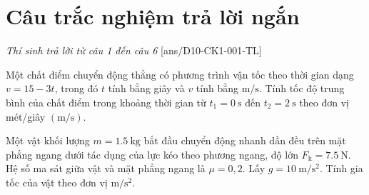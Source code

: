 \section{Câu trắc nghiệm trả lời ngắn} \textit{Thí sinh trả lời từ câu 1 đến câu 6}
\setcounter{ex}{0}
[ans/D10-CK1-001-TL]
\begin{ex}
	Một chất điểm chuyển động thẳng có phương trình vận tốc theo thời gian dạng $v=15-3t$, trong đó $t$ tính bằng giây và $v$ tính bằng $\si{\meter/\second}$. Tính tốc độ trung bình của chất điểm trong khoảng thời gian từ $t_1=\SI{0}{\second}$ đến $t_2=\SI{2}{\second}$ theo đơn vị mét/giây $\left(\si{\meter/\second}\right)$.
	\loigiai{
		
	}
\end{ex}
\begin{ex}
	Một vật khối lượng $m=\SI{1.5}{\kilogram}$ bắt đầu chuyển động nhanh dần đều trên mặt phẳng ngang dưới tác dụng của lực kéo theo phương ngang, độ lớn $F_{\mathrm{k}}=\SI{7.5}{\newton}$. Hệ số ma sát giữa vật và mặt phẳng ngang là $\mu=0,2$. Lấy $g=\SI{10}{\meter/\second^2}$. Tính gia tốc của vật theo đơn vị $\si{\meter/\second^2}$.
	\loigiai{
		
	}
\end{ex}
